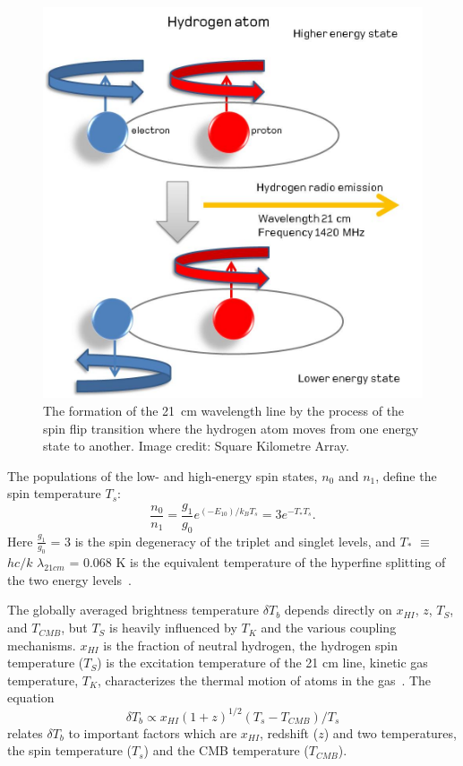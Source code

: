 \begin{figure}
	\begin{center}
		\includegraphics[width=0.5\linewidth]{Figures/Hydrogenemission1.jpeg}
		\caption{The formation of the \SI{21}{cm} wavelength line by the process of the spin flip transition where the hydrogen atom moves from one energy state to another. Image credit: {Square Kilometre Array}.}
		\label{Fig:21cm}
	\end{center}
\end{figure}

The populations of the low- and high-energy spin states, $n_0$ and $n_1$, define the spin temperature $T_s$:
\begin{equation}
\frac{n_0}{n_1} = \frac{g_1}{g_0}e^{(-E_10)/{k_B}{T_s}} = 3e^{{-T_*}{T_s}}.
\end{equation}
Here $\frac{g_1}{g_0}$ = 3 is the spin degeneracy of the triplet and singlet levels, and $T_{*}$ $\equiv$ $hc/k$ $\lambda_{21cm}$ = 0.068 K is the equivalent temperature of the hyperfine splitting of the two energy levels~\citep{2012RPPh...75h6901P}.

The globally averaged brightness temperature $\delta$$T_b$ depends directly on $x_{HI}$, $z$, $T_S$, and $T_{CMB}$, but $T_S$ is heavily influenced by $T_K$ and the various coupling mechanisms. $x_{HI}$ is the fraction of neutral hydrogen, the hydrogen spin temperature ($T_S$) is the excitation temperature of the 21 cm line, kinetic gas temperature, $T_K$, characterizes the thermal motion of atoms in the gas~\citep{2015aska.confE...1K,2006PhR...433..181F}. The equation	
\begin{equation}
\delta{T_b}\propto {x_{HI}}(1+z)^{1/2}({T_s}-{T_{CMB}})/{T_s}
\end{equation}
relates $\delta$$T_b$ to important factors which are \(x_{HI}\), redshift ($z$) and two temperatures, the spin temperature ($T_s$) and the CMB temperature ($T_{CMB}$).

